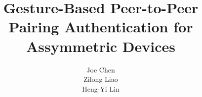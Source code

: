 \documentclass[letterpaper]{sig-alternate-05-2015}
\begin{document}

\title{Gesture-Based Peer-to-Peer Pairing Authentication for Assymmetric  Devices}

\author{
\alignauthor
Joe Chen\\
 \alignauthor
Zilong Liao\\
\alignauthor
Heng-Yi Lin\\
}

\maketitle
%

%
%
%
%







\nocite{*} 


\end{document}
